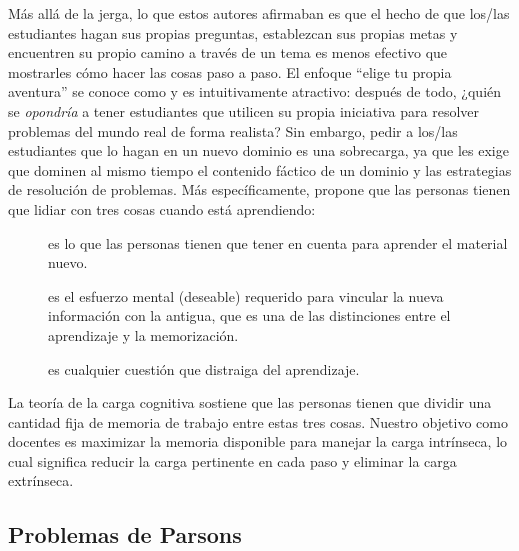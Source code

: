 Más allá de la jerga,
lo que estos autores afirmaban es que el hecho de que los/las estudiantes hagan sus propias preguntas,
establezcan sus propias metas y
encuentren su propio camino a través de un tema es menos efectivo que mostrarles
cómo hacer las cosas paso a paso. El enfoque ``elige tu propia aventura'' se conoce como 
y es intuitivamente atractivo: después de todo,
¿quién se \emph{opondría} a tener estudiantes que utilicen su propia iniciativa
para resolver problemas del mundo real de forma realista?
Sin embargo, pedir a los/las estudiantes que lo hagan en un nuevo dominio es una sobrecarga,
ya que les exige que dominen al mismo tiempo el contenido fáctico de un dominio y las estrategias de resolución de problemas.
Más específicamente,
 propone que
las personas tienen que lidiar con tres cosas cuando está aprendiendo:


\begin{description}

\item[]
  es lo que las personas tienen que tener en cuenta para aprender el material nuevo.

\item[]
  es el esfuerzo mental (deseable) requerido para vincular la nueva información con la antigua,
  que es una de las distinciones entre el aprendizaje y la memorización.

\item[]
es cualquier cuestión que distraiga del aprendizaje.

\end{description}

La teoría de la carga cognitiva sostiene que
las personas tienen que dividir una cantidad fija de memoria de trabajo entre estas tres cosas.
Nuestro objetivo como docentes es maximizar la memoria disponible para manejar la carga intrínseca,
lo cual significa reducir la carga pertinente en cada paso y eliminar la carga extrínseca.


\subsection*{Problemas de Parsons}

